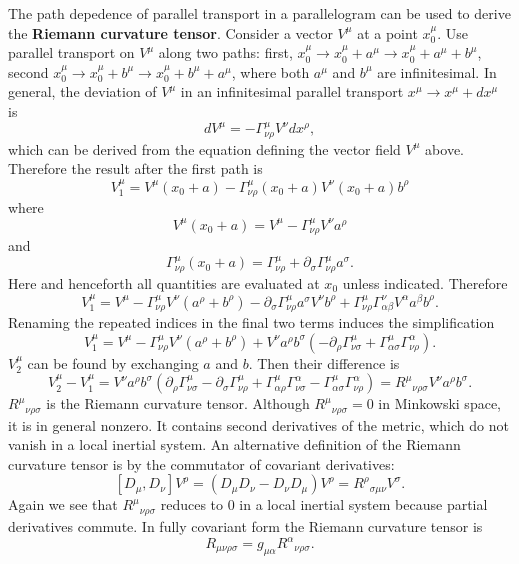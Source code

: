 \documentclass[11pt]{article}
\begin{document}
The path depedence of parallel transport in a parallelogram can be used to derive the \textbf{Riemann curvature tensor}.
Consider a vector $V^\mu$ at a point $x^\mu_0$.
Use parallel transport on $V^\mu$ along two paths: first, $x_0^\mu \rightarrow x_0^\mu + a^\mu \rightarrow x_0^\mu + a^\mu + b^\mu$, second $x_0^\mu \rightarrow x_0^\mu + b^\mu \rightarrow x_0^\mu + b^\mu + a^\mu$, where both $a^\mu$ and $b^\mu$ are infinitesimal.
In general, the deviation of $V^\mu$ in an infinitesimal parallel transport $x^\mu \rightarrow x^\mu + dx^\mu$ is
$$ dV^\mu = - \Gamma^\mu_{\nu \rho} V^\nu dx^\rho, $$
which can be derived from the equation defining the vector field $V^\mu$ above.
Therefore the result after the first path is
$$ V^\mu_1 = V^\mu(x_0 + a) - \Gamma^\mu_{\nu \rho}(x_0 + a) V^\nu(x_0 + a) b^\rho $$
where
$$ V^\mu(x_0 + a) = V^\mu - \Gamma^\mu_{\nu \rho} V^\nu a^\rho $$
and
$$ \Gamma^\mu_{\nu \rho}(x_0 + a) = \Gamma^\mu_{\nu \rho} + \partial_\sigma \Gamma^\mu_{\nu \rho} a^\sigma. $$
Here and henceforth all quantities are evaluated at $x_0$ unless indicated.
Therefore
$$ V_1^\mu = V^\mu - \Gamma^\mu_{\nu \rho} V^\nu (a^\rho + b^\rho) - \partial_\sigma \Gamma^\mu_{\nu \rho} a^\sigma V^\nu b^\rho + \Gamma^\mu_{\nu \rho} \Gamma^\nu_{\alpha \beta} V^\alpha a^\beta b^\rho. $$
Renaming the repeated indices in the final two terms induces the simplification
$$ V_1^\mu =  V^\mu - \Gamma^\mu_{\nu \rho} V^\nu (a^\rho + b^\rho) + V^\nu a^\rho b^\sigma \left( -\partial_\rho \Gamma^\mu_{\nu \sigma} + \Gamma^\mu_{\alpha \sigma} \Gamma^\alpha_{\nu \rho} \right). $$
$V_2^\mu$ can be found by exchanging $a$ and $b$. Then their difference is
$$V_2^\mu - V_1^\mu = V^\nu a^\rho b^\sigma \left( \partial_\rho \Gamma^\mu_{\nu \sigma} - \partial_\sigma \Gamma^\mu_{\nu \rho} + \Gamma^\mu_{\alpha \rho} \Gamma^\alpha_{\nu \sigma} - \Gamma^\mu_{\alpha \sigma} \Gamma^\alpha_{\nu \rho} \right) = R^\mu{}_{\nu \rho \sigma} V^\nu a^\rho b^\sigma. $$
$R^\mu{}_{\nu \rho \sigma}$ is the Riemann curvature tensor.
Although $R^\mu{}_{\nu \rho \sigma} = 0$ in Minkowski space, it is in general nonzero.
It contains second derivatives of the metric, which do not vanish in a local inertial system.
An alternative definition of the Riemann curvature tensor is by the commutator of covariant derivatives:
$$ [D_\mu, D_\nu] V^\rho = (D_\mu D_\nu - D_\nu D_\mu ) V^\rho = R^\rho{}_{\sigma \mu \nu} V^\sigma. $$
Again we see that $R^\mu{}_{\nu \rho \sigma}$ reduces to $0$ in a local inertial system because partial derivatives commute.
In fully covariant form the Riemann curvature tensor is
$$ R_{\mu \nu \rho \sigma} = g_{\mu \alpha} R^\alpha{}_{\nu \rho \sigma}. $$
\end{document}
